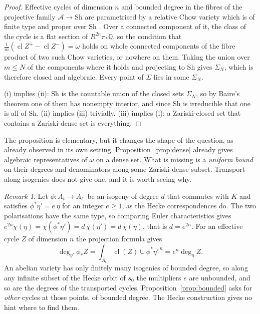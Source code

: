 \documentclass[11pt]{amsart}
\theoremstyle{definition}
\theoremstyle{remark}
\newtheorem{remark}[theorem]{Remark}
\newcommand{\QQ}{\mathbb{Q}}
\newcommand{\Sh}{\mathrm{Sh}}
\newcommand{\cl}{\operatorname{cl}}
\begin{document}
\begin{proof}
Effective cycles of dimension $n$ and bounded degree in the fibres of the
projective family $\mathcal A\to\Sh$ are parametrised by a relative Chow
variety which is of finite type and proper over $\Sh$ \cite[Ch.~I]{Kol96}.
Over a connected component of it, the class of the cycle is a flat section
of $R^{2n}\pi_{*}\QQ$, so the condition that
$\frac1m(\cl Z^{+}-\cl Z^{-})=\omega$ holds on whole connected components
of the fibre product of two such Chow varieties, or nowhere on them. Taking
the union over $m\le N$ of the components where it holds and projecting to
$\Sh$ gives $\Sigma_{N}$, which is therefore closed and algebraic. Every
point of $\Sigma$ lies in some $\Sigma_{N}$.

(i) implies (ii): $\Sh$ is the countable union of the closed sets
$\Sigma_{N}$, so by Baire's theorem one of them has nonempty interior, and
since $\Sh$ is irreducible that one is all of $\Sh$. (ii) implies (iii)
trivially. (iii) implies (i): a Zariski-closed set that contains a
Zariski-dense set is everything.
\end{proof}

The proposition is elementary, but it changes the shape of the question,
as \cite{BhH8} already observed in its own setting.
Proposition~\ref{prop:dense} already gives algebraic representatives of
$\omega$ on a dense set. What is missing is a \emph{uniform bound} on their
degrees and denominators along some Zariski-dense subset. Transport along
isogenies does not give one, and it is worth seeing why.

\begin{remark}\label{rem:hecke}
Let $\phi\colon A_{t}\to A_{t'}$ be an isogeny of degree $d$ that commutes
with $K$ and satisfies $\phi^{*}\eta'=e\,\eta$ for an integer $e\ge1$, as
the Hecke correspondences do. The two polarisations have the same type, so
comparing Euler characteristics gives
$e^{2n}\chi(\eta)=\chi(\phi^{*}\eta')=d\,\chi(\eta')=d\,\chi(\eta)$, that is
$d=e^{2n}$. For an effective cycle $Z$ of dimension $n$ the projection
formula gives
\[
  \deg_{\eta'}\phi_{*}Z=\int_{A_{t}}\cl(Z)\cup\phi^{*}\eta'^{\,n}
  =e^{n}\deg_{\eta}Z .
\]
An abelian variety has only finitely many isogenies of bounded degree, so
along any infinite subset of the Hecke orbit of $s_{0}$ the multipliers $e$
are unbounded, and so are the degrees of the transported cycles.
Proposition~\ref{prop:bounded} asks for \emph{other} cycles at those
points, of bounded degree. The Hecke construction gives no hint where to
find them.
\end{remark}
\end{document}
